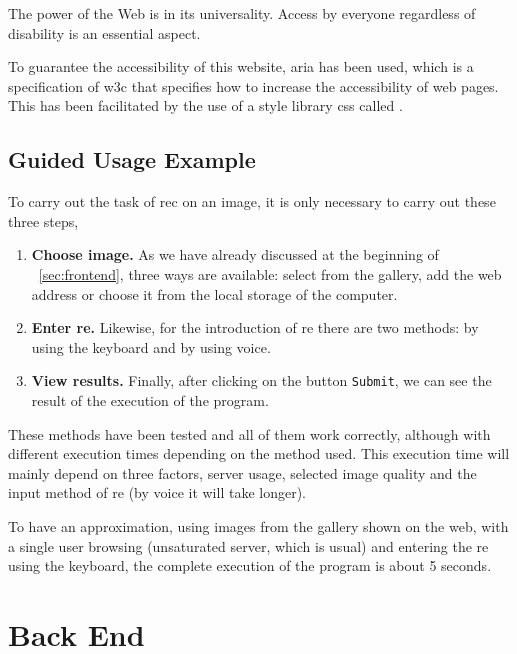 \begin{quoteBox}
  The power of the Web is in its universality. Access by everyone regardless of
  disability is an essential aspect.
  \tcblower{}
\end{quoteBox}

To guarantee the accessibility of this website, \gls{aria} has been used, which
is a specification of \gls{w3c} that specifies how to increase the
accessibility of web pages. This has been facilitated by the use of a style
library \gls{css} called .


\subsection{Guided Usage Example}

To carry out the task of \gls{rec} on an image, it is only necessary to carry
out these three steps,
\begin{enumerate}
  \item \textbf{Choose image.} As we have already discussed at the beginning of
 \ \vref{sec:frontend}, three ways are available: select from the gallery, add
  the web address or choose it from the local storage of the computer.
  \item \textbf{Enter \gls{re}.} Likewise, for the introduction of \gls{re}
  there are two methods: by using the keyboard and by using voice.
  \item \textbf{View results.} Finally, after clicking on the button
  \texttt{Submit}, we can see the result of the execution of the program.
\end{enumerate}

These methods have been tested and all of them work correctly, although with
different execution times depending on the method used. This execution time
will mainly depend on three factors, server usage, selected image quality and
the input method of \gls{re} (by voice it will take longer).

\begin{exampleBox}
  To have an approximation, using images from the gallery shown on the web,
  with a single user browsing (unsaturated server, which is usual) and entering
  the \gls{re} using the keyboard, the complete execution of the program is
  about 5 seconds.
\end{exampleBox}



\section{Back End}\label{sec:backend}

